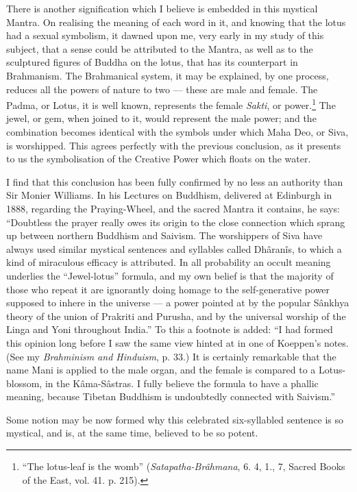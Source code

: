 \documentclass[a4paper, 11pt, oneside, polutonikogreek, english]{article}
\begin{document}
There is another signification which I believe is embedded in this mystical Mantra. On realising the meaning of each word in it, and knowing that the lotus had a sexual symbolism, it dawned upon me, very early in my study of this subject, that a sense could be attributed to the Mantra, as well as to the sculptured figures of Buddha on the lotus, that has its counterpart in Brahmanism. The Brahmanical system, it may be explained, by one process, reduces all the powers of nature to two --- these are male and female. The Padma, or Lotus, it is well known, represents the female \emph{Sakti}, or power.\footnote{``The lotus-leaf is the womb'' (\emph{Satapatha-Brâhmana}, 6. 4, 1., 7, Sacred Books of the East, vol. 41. p. 215).} The jewel, or gem, when joined to it, would represent the male power; and the combination becomes identical with the symbols under which Maha Deo, or Siva, is worshipped. This agrees perfectly with the previous conclusion, as it presents to us the symbolisation of the Creative Power which floats on the water.

I find that this conclusion has been fully confirmed by no less an authority than Sir Monier Williams. In his Lectures on Buddhism, delivered at Edinburgh in 1888, regarding the Praying-Wheel, and the sacred Mantra it contains, he says: ``Doubtless the prayer really owes its origin to the close connection which sprang up between northern Buddhism and Saivism. The worshippers of Siva have always used similar mystical sentences and syllables called Dhâranîs, to which a kind of miraculous efficacy is attributed. In all probability an occult meaning underlies the ``Jewel-lotus'' formula, and my own belief is that the majority of those who repeat it are ignorantly doing homage to the self-generative power supposed to inhere in the universe --- a power pointed at by the popular Sânkhya theory of the union of Prakriti and Purusha, and by the universal worship of the Linga and Yoni throughout India.'' To this a footnote is added: ``I had formed this opinion long before I saw the same view hinted at in one of Koeppen's notes. (See my \emph{Brahminism and Hinduism}, p. 33.) It is certainly remarkable that the name Mani is applied to the male organ, and the female is compared to a Lotus-blossom, in the Kâma-Sâstras. I fully believe the formula to have a phallic meaning, because Tibetan Buddhism is undoubtedly connected with Saivism.''

Some notion may be now formed why this celebrated six-syllabled sentence is so mystical, and is, at the same time, believed to be so potent.
\clearpage
\end{document}
